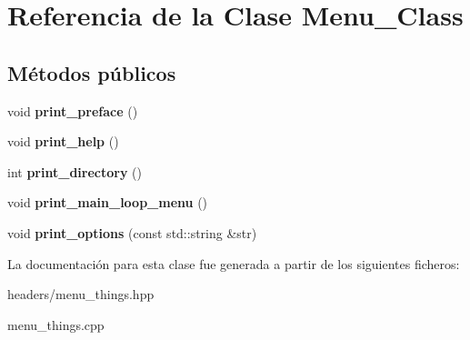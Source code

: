 \hypertarget{class_menu___class}{}\section{Referencia de la Clase Menu\+\_\+\+Class}
\label{class_menu___class}
\subsection*{Métodos públicos}
\begin{DoxyCompactItemize}
\item 
void {\bfseries print\+\_\+preface} ()\hypertarget{class_menu___class_ac15bd27926bcdad8dfb6415472aee4bf}{}\label{class_menu___class_ac15bd27926bcdad8dfb6415472aee4bf}

\item 
void {\bfseries print\+\_\+help} ()\hypertarget{class_menu___class_a228296373587bc325379923221e5abf4}{}\label{class_menu___class_a228296373587bc325379923221e5abf4}

\item 
int {\bfseries print\+\_\+directory} ()\hypertarget{class_menu___class_a9c5983a219395bb87d032ddfb1425873}{}\label{class_menu___class_a9c5983a219395bb87d032ddfb1425873}

\item 
void {\bfseries print\+\_\+main\+\_\+loop\+\_\+menu} ()\hypertarget{class_menu___class_ae28cf78b5be2bea670ac24fbe89920df}{}\label{class_menu___class_ae28cf78b5be2bea670ac24fbe89920df}

\item 
void {\bfseries print\+\_\+options} (const std\+::string \&str)\hypertarget{class_menu___class_a97f33152f31c98c3cc967f23dd18fcfd}{}\label{class_menu___class_a97f33152f31c98c3cc967f23dd18fcfd}

\end{DoxyCompactItemize}


La documentación para esta clase fue generada a partir de los siguientes ficheros\+:\begin{DoxyCompactItemize}
\item 
headers/menu\+\_\+things.\+hpp\item 
menu\+\_\+things.\+cpp\end{DoxyCompactItemize}
